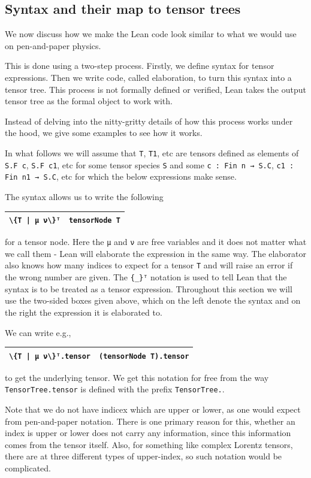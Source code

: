 \documentclass[a4paper, 11pt]{article}
\DeclareRobustCommand{\myinline}{\lstinline}
\newcommand{\syntaxElab}[2]{ 
  \arrayrulecolor{mycolor}
  \begin{center}
    \begin{tabular}{|p{1.7in} | p{4in}|}
    \hline
    \hfill {#1} & {#2} \\
    \hline
    \end{tabular}
    \end{center}
  \arrayrulecolor{black}
}
\begin{document}
\subsection{Syntax and their map to tensor trees}


We now discuss how we make the Lean code look similar to what we would use on pen-and-paper physics. 

This is done using a two-step process. Firstly, we define syntax for tensor expressions. 
Then we write code, called elaboration, to turn this syntax into a tensor tree. This process is not formally defined or 
verified, Lean takes the output tensor tree as the formal object to work with.

Instead of delving into the nitty-gritty details of how this process works under the hood, 
we give some examples to see how it works. 

In what follows we will assume that \myinline|T|, \myinline|T1|, etc are tensors defined as 
elements of \myinline|S.F c|, \myinline|S.F c1|, etc for 
some tensor species \myinline|S| and some \myinline|c : Fin n → S.C|, \myinline|c1 : Fin n1 → S.C|, etc 
for which the below expressions make sense.

The syntax allows us to write the following 
\syntaxElab{\lstinline!\{T | μ ν\}ᵀ!}{{\lstinline!tensorNode T!}}
for a tensor node. Here the \myinline|μ| and \myinline|ν| are free variables and it does not 
matter what we call them - Lean will elaborate the expression in the same way.
The elaborator also knows how many indices to expect for a tensor \myinline|T| and will raise an error if
the wrong number are given. The \myinline|{_}ᵀ| notation is used to tell Lean that the syntax
is to be treated as a tensor expression. Throughout this section we will use the two-sided boxes 
given above, which on the left denote the syntax and on the right the expression it is elaborated to. 

We can write e.g.,
\syntaxElab{\lstinline!\{T | μ ν\}ᵀ.tensor!}{{\lstinline!(tensorNode T).tensor!}}
to get the underlying tensor. We get this notation for free from the way \myinline|TensorTree.tensor|
is defined with the prefix \myinline|TensorTree.|.

Note that we do not have indicex which are upper or lower, as one would expect from pen-and-paper notation.
There is one primary reason for this, whether an index is upper or lower does not carry any information, 
since this information comes from the tensor itself. Also, for something like complex Lorentz tensors, 
there are at three different types of upper-index, so such notation would be complicated. 
\end{document}

